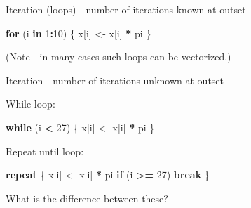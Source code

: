 \documentclass[ignorenonframetext,]{beamer}
\newenvironment{Shaded}{\begin{snugshade}}{\end{snugshade}}
\newcommand{\DecValTok}[1]{\textcolor[rgb]{0.00,0.00,0.81}{#1}}
\newcommand{\StringTok}[1]{\textcolor[rgb]{0.31,0.60,0.02}{#1}}
\newcommand{\ControlFlowTok}[1]{\textcolor[rgb]{0.13,0.29,0.53}{\textbf{#1}}}
\newcommand{\OperatorTok}[1]{\textcolor[rgb]{0.81,0.36,0.00}{\textbf{#1}}}
\newcommand{\NormalTok}[1]{#1}
\begin{document}
\begin{frame}[fragile]{Iteration (loops) - number of iterations known at
outset}

\begin{Shaded}
\begin{Highlighting}[]
\ControlFlowTok{for}\NormalTok{ (i }\ControlFlowTok{in} \DecValTok{1}\OperatorTok{:}\DecValTok{10}\NormalTok{) \{}
\NormalTok{  x[i] <-}\StringTok{ }\NormalTok{x[i] }\OperatorTok{*}\StringTok{ }\NormalTok{pi}
\NormalTok{\}}
\end{Highlighting}
\end{Shaded}

(Note - in many cases such loops can be vectorized.)

\end{frame}

\begin{frame}[fragile]{Iteration - number of iterations unknown at
outset}

While loop:

\begin{Shaded}
\begin{Highlighting}[]
\ControlFlowTok{while}\NormalTok{ (i }\OperatorTok{<}\StringTok{ }\DecValTok{27}\NormalTok{) \{}
\NormalTok{  x[i] <-}\StringTok{ }\NormalTok{x[i] }\OperatorTok{*}\StringTok{ }\NormalTok{pi}
\NormalTok{\}}
\end{Highlighting}
\end{Shaded}

Repeat until loop:

\begin{Shaded}
\begin{Highlighting}[]
\ControlFlowTok{repeat}\NormalTok{ \{ }
\NormalTok{  x[i] <-}\StringTok{ }\NormalTok{x[i] }\OperatorTok{*}\StringTok{ }\NormalTok{pi}
  \ControlFlowTok{if}\NormalTok{ (i }\OperatorTok{>=}\StringTok{ }\DecValTok{27}\NormalTok{) }\ControlFlowTok{break}
\NormalTok{\}}
\end{Highlighting}
\end{Shaded}

What is the difference between these?

\end{frame}
\end{document}
